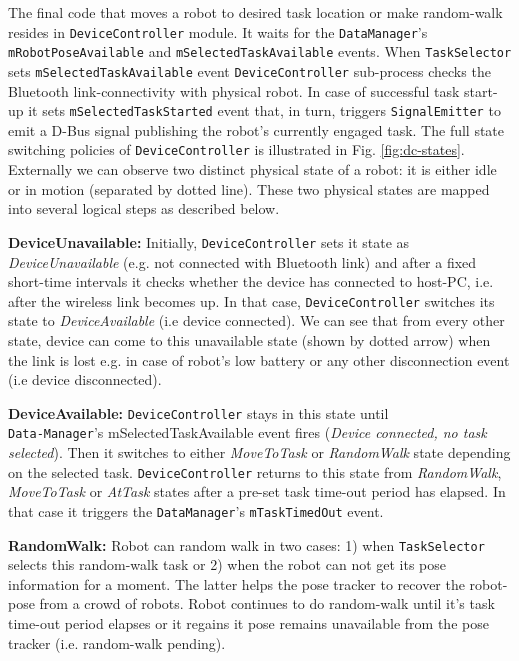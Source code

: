 \documentclass[final,5p,times,twocolumn]{elsarticle}
\begin{document}
The final code that moves a robot to desired task location or make random-walk resides in \texttt{DeviceController} module. It waits for the \texttt{DataManager}'s \texttt{mRobotPoseAvailable} and \texttt{mSelectedTaskAvailable} events. When \texttt{TaskSelector} sets  \texttt{mSelectedTaskAvailable} event \texttt{DeviceController} sub-process checks the Bluetooth link-connectivity with physical robot. In case of successful task start-up it sets \texttt{mSelectedTaskStarted} event that, in turn, triggers \texttt{SignalEmitter} to emit a D-Bus signal publishing the robot's currently engaged task. The full state switching policies of \texttt{DeviceController} is illustrated in Fig. \ref{fig:dc-states}. Externally we can observe two distinct physical state of a robot: it is either idle or in motion (separated by dotted line). These two physical states are mapped into several logical steps as described below.

\textbf{DeviceUnavailable: }
Initially, \texttt{DeviceController} sets it state as \textit{DeviceUnavailable} (e.g. not connected with Bluetooth link) and after a fixed short-time intervals it checks whether the device has connected to host-PC, i.e. after the  wireless link becomes up. In that case, \texttt{DeviceController} switches its state to \textit{DeviceAvailable} (i.e device connected). We can see that from every other state, device can come to this unavailable state (shown by dotted arrow) when the  link is lost e.g. in case of robot's low battery or any other disconnection event (i.e device disconnected).

\textbf{DeviceAvailable: }
\texttt{DeviceController} stays in this state until\\ \texttt{Data-Manager}'s mSelectedTaskAvailable event fires ({\em Device connected, no task selected}). Then it switches to either \textit{MoveToTask} or \textit{RandomWalk} state depending on the selected task.  \texttt{DeviceController}  returns to this state from \textit{RandomWalk}, \textit{MoveToTask} or \textit{AtTask} states after a pre-set task time-out period has elapsed.  In that case it triggers the \texttt{DataManager}'s \texttt{mTaskTimedOut} event.

\textbf{RandomWalk: }
Robot can random walk in two cases: 1) when \texttt{TaskSelector} selects this random-walk task or 2) when the robot can not get its pose information for a moment. The latter helps the pose tracker to recover the robot-pose from a crowd of robots. Robot continues to do random-walk until it's task time-out period elapses or it regains it pose remains unavailable from the pose tracker (i.e. random-walk pending).
\end{document}
